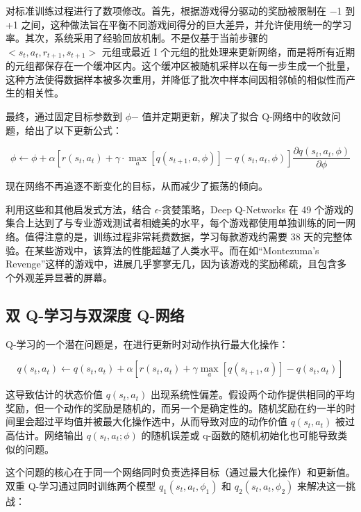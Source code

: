 对标准训练过程进行了数项修改。首先，根据游戏得分驱动的奖励被限制在 −1 到 +1 之间，这种做法旨在平衡不同游戏间得分的巨大差异，并允许使用统一的学习率。其次，系统采用了经验回放机制。不是仅基于当前步骤的 \(<s_t, a_t, r_{t+1}, s_{t+1}>\) 元组或最近 I 个元组的批处理来更新网络，而是将所有近期的元组都保存在一个缓冲区内。这个缓冲区被随机采样以在每一步生成一个批量，这种方法使得数据样本被多次重用，并降低了批次中样本间因相邻帧的相似性而产生的相关性。

最终，通过固定目标参数到 \(\phi\)− 值并定期更新，解决了拟合 Q-网络中的收敛问题，给出了以下更新公式：

\begin{equation}
\phi \leftarrow \phi + \alpha \left[ r(s_t, a_t) + \gamma \cdot \max_a [q(s_{t+1}, a, \phi)] - q(s_t, a_t, \phi) \right] \frac{\partial q(s_t, a_t, \phi)}{\partial \phi} 
\end{equation}


现在网络不再追逐不断变化的目标，从而减少了振荡的倾向。

利用这些和其他启发式方法，结合 \(\epsilon\)-贪婪策略，Deep Q-Networks 在 49 个游戏的集合上达到了与专业游戏测试者相媲美的水平，每个游戏都使用单独训练的同一网络。值得注意的是，训练过程非常耗费数据，学习每款游戏约需要 38 天的完整体验。在某些游戏中，该算法的性能超越了人类水平。而在如“Montezuma's Revenge”这样的游戏中，进展几乎寥寥无几，因为该游戏的奖励稀疏，且包含多个外观差异显著的屏幕。

\subsection{双 Q-学习与双深度 Q-网络}
Q-学习的一个潜在问题是，在进行更新时对动作执行最大化操作：

\begin{equation}
q(s_t, a_t) \leftarrow q(s_t, a_t) + \alpha \left[ r(s_t, a_t) + \gamma \max_{a} [q(s_{t+1}, a)] - q(s_t, a_t) \right] 
\end{equation}

这导致估计的状态价值 \(q(s_t, a_t)\) 出现系统性偏差。假设两个动作提供相同的平均奖励，但一个动作的奖励是随机的，而另一个是确定性的。随机奖励在约一半的时间里会超过平均值并被最大化操作选中，从而导致对应的动作价值 \(q(s_t, a_t)\) 被过高估计。网络输出 \(q(s_t, a_t; \phi)\) 的随机误差或 q-函数的随机初始化也可能导致类似的问题。

这个问题的核心在于同一个网络同时负责选择目标（通过最大化操作）和更新值。双重 Q-学习通过同时训练两个模型 \(q_1(s_t, a_t, \phi_1)\) 和 \(q_2(s_t, a_t, \phi_2)\) 来解决这一挑战：


